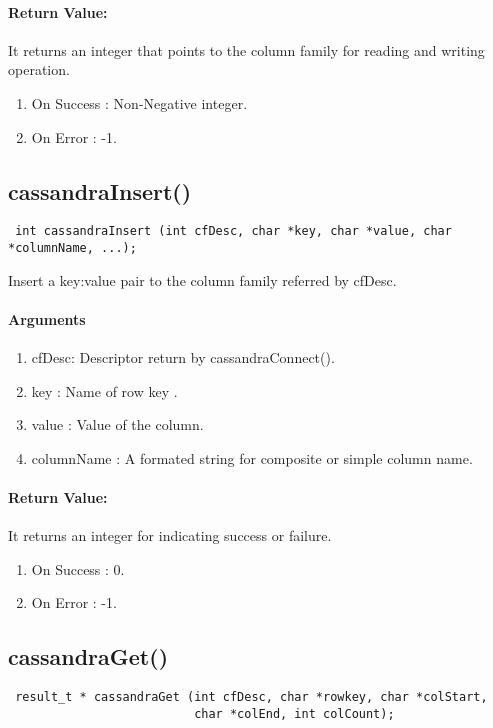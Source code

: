 \documentclass[12 pt , a4paper ]{report}
\begin{document}
 \paragraph{Return Value:}
 It returns an integer that points to the column family for reading and writing operation.
\begin{enumerate}
 \item On Success : Non-Negative integer. 
 \item On Error   : -1.
\end{enumerate}

\subsection{cassandraInsert()}
\begin{verbatim}
 int cassandraInsert (int cfDesc, char *key, char *value, char *columnName, ...);
\end{verbatim}

  Insert  a key:value pair to the column family referred by cfDesc.

  \paragraph{Arguments}
  \begin{enumerate}
   \item cfDesc: Descriptor return by cassandraConnect().
   \item key : Name of row key .
   \item value :       Value of the column.
   \item columnName : A formated string for composite or simple column name.
  \end{enumerate}

 \paragraph{Return Value:}
 It returns an integer for indicating success or failure.
\begin{enumerate}
 \item On Success : 0.
 \item On Error   : -1.
\end{enumerate}

\subsection{cassandraGet()}
\begin{verbatim}
 result_t * cassandraGet (int cfDesc, char *rowkey, char *colStart, 
                          char *colEnd, int colCount);
\end{verbatim}
\end{document}
